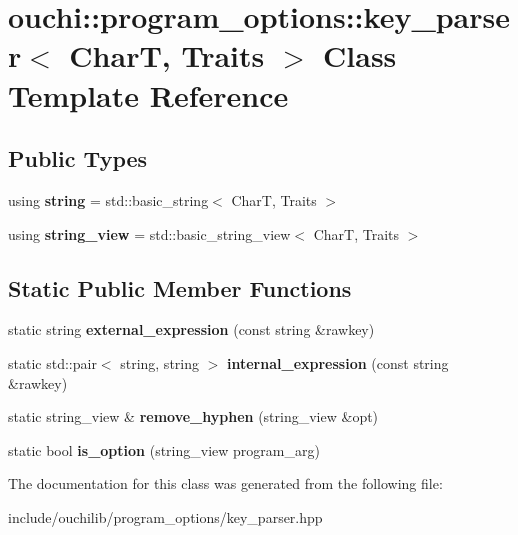 \hypertarget{classouchi_1_1program__options_1_1key__parser}{}\section{ouchi\+::program\+\_\+options\+::key\+\_\+parser$<$ CharT, Traits $>$ Class Template Reference}
\label{classouchi_1_1program__options_1_1key__parser}
\subsection*{Public Types}
\begin{DoxyCompactItemize}
\item 
\mbox{\label{classouchi_1_1program__options_1_1key__parser_adfcfac12f373ba4c0ce2ca1e5196d165}} 
using {\bfseries string} = std\+::basic\+\_\+string$<$ CharT, Traits $>$
\item 
\mbox{\label{classouchi_1_1program__options_1_1key__parser_a98b2e75e77b496e8460086a1390e0896}} 
using {\bfseries string\+\_\+view} = std\+::basic\+\_\+string\+\_\+view$<$ CharT, Traits $>$
\end{DoxyCompactItemize}
\subsection*{Static Public Member Functions}
\begin{DoxyCompactItemize}
\item 
\mbox{\label{classouchi_1_1program__options_1_1key__parser_abb3cc5780e520a8919154cfa5f188ea8}} 
static string {\bfseries external\+\_\+expression} (const string \&rawkey)
\item 
\mbox{\label{classouchi_1_1program__options_1_1key__parser_a49232c13fda31b9f3c865d39a78083a5}} 
static std\+::pair$<$ string, string $>$ {\bfseries internal\+\_\+expression} (const string \&rawkey)
\item 
\mbox{\label{classouchi_1_1program__options_1_1key__parser_a5135975b64a82640cf9c2823101d1f54}} 
static string\+\_\+view \& {\bfseries remove\+\_\+hyphen} (string\+\_\+view \&opt)
\item 
\mbox{\label{classouchi_1_1program__options_1_1key__parser_a231e84568a05be5fcad3d05bfd3e4a87}} 
static bool {\bfseries is\+\_\+option} (string\+\_\+view program\+\_\+arg)
\end{DoxyCompactItemize}


The documentation for this class was generated from the following file\+:\begin{DoxyCompactItemize}
\item 
include/ouchilib/program\+\_\+options/key\+\_\+parser.\+hpp\end{DoxyCompactItemize}
